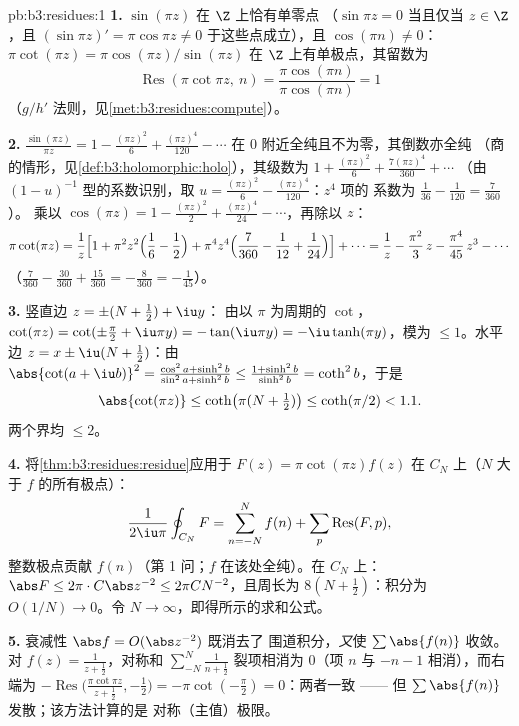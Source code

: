 \begin{solution}{pb:b3:residues:1}
\textbf{1.} $\sin(\pi z)$ 在 $\Z$ 上恰有单零点
（$\sin\pi z = 0$ 当且仅当 $z \in \Z$，且 $(\sin\pi z)' = \pi\cos\pi
z \neq 0$ 于这些点成立），且 $\cos(\pi n) \neq 0$：$\pi\cot(\pi z) =
\pi\cos(\pi z)/\sin(\pi z)$ 在 $\Z$ 上有单极点，其留数为
\[
\operatorname{Res}(\pi\cot\pi z,\ n)
= \frac{\pi\cos(\pi n)}{\pi\cos(\pi n)} = 1
\]
（$g/h'$ 法则，见\cref{met:b3:residues:compute}）。

\textbf{2.} $\frac{\sin(\pi z)}{\pi z} = 1 - \frac{(\pi z)^2}6
+ \frac{(\pi z)^4}{120} - \cdots$ 在
$0$ 附近全纯且不为零，其倒数亦全纯
（商的情形，见\cref{def:b3:holomorphic:holo}），其级数为 $1 +
\frac{(\pi z)^2}{6} + \frac{7(\pi z)^4}{360} + \cdots$
（由 $(1 - u)^{-1}$ 型的系数识别，取 $u =
\frac{(\pi z)^2}6 - \frac{(\pi z)^4}{120}$：$z^4$ 项的
系数为 $\frac1{36} - \frac1{120} = \frac{7}{360}$）。
乘以 $\cos(\pi z) = 1 - \frac{(\pi z)^2}2 + \frac{(\pi
z)^4}{24} - \cdots$，再除以 $z$：
\[
\pi\cot(\pi z) = \frac1z\Bigl[1 + \pi^2z^2\Bigl(\frac16 -
\frac12\Bigr) + \pi^4z^4\Bigl(\frac7{360} - \frac1{12} +
\frac1{24}\Bigr)\Bigr] + \cdots
= \frac1z - \frac{\pi^2}3\,z - \frac{\pi^4}{45}\,z^3 -
\cdots
\]
（$\frac7{360} - \frac{30}{360} + \frac{15}{360} =
-\frac8{360} = -\frac1{45}$）。

\textbf{3.} 竖直边 $z = \pm(N + \frac12) + \iu y$：
由以 $\pi$ 为周期的 $\cot$，$\cot(\pi z) = \cot(\pm\frac\pi2
+ \iu\pi y) = -\tan(\iu\pi y) = -\iu\tanh(\pi y)$，模为
$\leq 1$。水平边 $z = x \pm \iu(N + \frac12)$：由
$\abs{\cot(a + \iu b)}^2 = \frac{\cos^2a +
\sinh^2b}{\sin^2a + \sinh^2b} \leq \frac{1 +
\sinh^2b}{\sinh^2b} = \coth^2 b$，于是
\[
\abs{\cot(\pi z)} \leq \coth\bigl(\pi(N + \tfrac12)\bigr)
\leq \coth(\pi/2) < 1.1 .
\]
两个界均 $\leq 2$。

\textbf{4.} 将\cref{thm:b3:residues:residue}应用于 $F(z) =
\pi\cot(\pi z)f(z)$ 在 $C_N$ 上（$N$ 大于 $f$ 的所有极点）：
\[
\frac1{2\iu\pi}\oint_{C_N}F = \sum_{n=-N}^{N}f(n) +
\sum_p\operatorname{Res}(F, p),
\]
整数极点贡献 $f(n)$（第 1 问；$f$
在该处全纯）。在 $C_N$ 上：$\abs F \leq 2\pi\cdot
C\abs z^{-2} \leq 2\pi C N^{-2}$，且周长为 $8(N +
\frac12)$：积分为 $O(1/N) \to 0$。令 $N \to
\infty$，即得所示的求和公式。

\textbf{5.} 衰减性 $\abs f = O(\abs z^{-2})$ 既消去了
围道积分，\emph{又}使 $\sum\abs{f(n)}$ 收敛。
对 $f(z) = \frac1{z + \frac12}$，对称和
$\sum_{-N}^N\frac1{n + \frac12}$ 裂项相消为 $0$（项
$n$ 与 $-n - 1$ 相消），而右端为
$-\operatorname{Res}\bigl(\frac{\pi\cot\pi z}{z + \frac12},
-\frac12\bigr) = -\pi\cot(-\frac\pi2) = 0$：两者一致 ——
但 $\sum\abs{f(n)}$ 发散；该方法计算的是
对称（主值）极限。


\end{solution}
